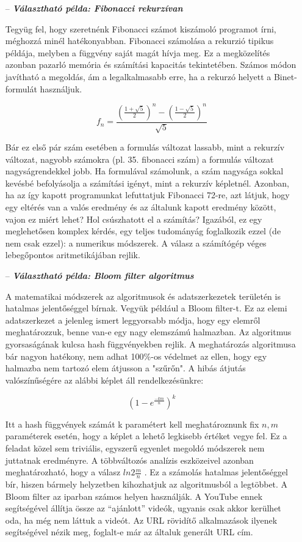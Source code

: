 \documentclass[../Main.tex]{subfiles}
\begin{document}
\begin{itemize}
    \item[--]  \textit{\textbf{{Választható példa: Fibonacci rekurzívan}}}
    
    Tegyüg fel, hogy szeretnénk Fibonacci számot kiszámoló programot írni, méghozzá minél hatékonyabban.
    Fibonacci számolása a rekurzió tipikus példája, melyben a függvény saját magát hívja meg. Ez a
    megközelítés azonban pazarló memória és számítási kapacitás tekintetében. Számos módon
    javítható a megoldás, ám a legalkalmasabb erre, ha a rekurzó helyett a Binet-formulát használjuk.

    \[ 
        f_n = \frac
            {
            (\frac{1 + \sqrt{5}}{2})^n - (\frac{1 - \sqrt{5}}{2})^n
            }
            {
                \sqrt{5}
            }
    \]

    Bár ez első pár szám esetében a formulás változat lassabb, mint a rekurzív változat,
    nagyobb számokra (pl. 35. fibonacci szám) a formulás változat nagyságrendekkel jobb.
    Ha formulával számolunk, a szám nagysága sokkal kevésbé befolyásolja a számítási igényt,
    mint a rekurzív képletnél. Azonban, ha az így kapott programunkat lefuttatjuk Fibonacci 72-re,
    azt látjuk, hogy egy eltérés van a valós eredmény és az általunk kapott eredmény között,
    vajon ez miért lehet? Hol csúszhatott el a számítás? Igazából, ez egy meglehetősen komplex kérdés,
    egy teljes tudományág foglalkozik ezzel (de nem csak ezzel): a numerikus módszerek.
    A válasz a számítógép véges lebegőpontos aritmetikájában rejlik.

    \item[--]  \textit{\textbf{Választható példa: Bloom filter algoritmus}}
     
        A matematikai módszerek az algoritmusok és adatszerkezetek területén is hatalmas jelentőséggel
        bírnak. Vegyük például a Bloom filter-t. Ez az elemi adatszerkezet a jelenleg ismert leggyorsabb
        módja, hogy egy elemről meghatározzuk, benne van-e egy nagy elemszámú halmazban. Az
        algoritmus gyorsaságának kulcsa hash függvényekben rejlik. A meghatározás algoritmusa bár
        nagyon hatékony, nem adhat 100\%-os védelmet az ellen, hogy egy halmazba nem tartozó elem
        átjusson a "szűrőn". A hibás átjutás valószínűségére az alábbi képlet áll rendelkezésünkre:

        \[
            (1 - e^{\frac{-km}{n}}) ^ k
        \]

        Itt a hash függvények számát k paramétert kell meghatároznunk fix \( n, m \) paraméterek esetén,
        hogy a képlet a lehető legkisebb értéket vegye fel. Ez a feladat közel sem triviális,
        egyszerű egyenlet megoldó módszerek nem juttatnak eredményre. A többváltozós analízis eszközeivel azonban meghatározható,
        hogy a válasz \( ln2 \frac{m}{n}\) . Ez a számolás hatalmas jelentőséggel bír, hiszen bármely helyzetben kihozhatjuk az algoritmusból a legtöbbet.
        A Bloom filter az iparban számos helyen használják. A YouTube ennek segítségével állítja össze az “ajánlott” videók,
        ugyanis csak akkor kerülhet oda, ha még nem láttuk a videót. Az URL rövidítő alkalmazások ilyenek segítségével nézik meg,
        foglalt-e már az általuk generált URL cím.
        
\end{itemize}
\end{document}
